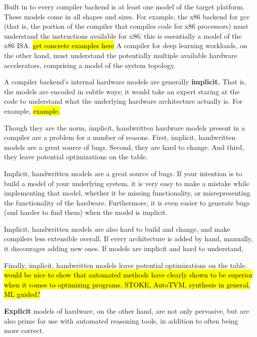 Built in to every compiler backend
  is at least one model
  of the target platform.
These models come in all shapes
  and sizes.
For example,
  the x86 backend for gcc
  (that is, the portion of the compiler
    that compiles code for x86 processors)
  must understand
  the instructions available
  for x86;
  this is essentially a model
  of the x86 ISA.
\hl{get concrete examples here}
A compiler for deep learning
  workloads,
  on the other hand,
  must understand
  the potentially multiple
  available hardware accelerators,
  comprising a model
  of the system topology.

A compiler backend's
  internal hardware models
  are generally
  \textbf{implicit.}
That is, 
  the models are encoded in subtle ways;
  it would take an expert
  staring at the code
  to understand what the underlying hardware
  architecture
  actually is.
For example, \hl{example.}
  
Though they are the norm,
  implicit, handwritten hardware models
  present in a compiler
  are a problem
  for a number of reasons.
First, implicit, handwritten models
  are a great source of bugs.
Second, they are hard to change.
And third, 
  they leave potential optimizations
  on the table.

Implicit,
  handwritten models
  are a great source of bugs.
If your intention is to build a model
  of your underlying system,
  it is very easy to make a mistake
  while implementing that model,
  whether it be missing functionality,
  or misrepresenting the functionality
  of the hardware.
Furthermore, it is even easier
  to generate bugs
  (and harder to find them)
  when the model is implicit.

Implicit, handwritten models
  are also
  hard to build and change,
  and make compilers less extensible overall.
If every architecture is added
  by hand, manually,
  it discourages adding new ones.
If models are implicit
  and hard to understand,


Finally,
  implicit, handwritten models
  leave potential optimizations on the table.
\hl{would be nice to show that automated methods have clearly shown
  to be superior when it comes to optimizing programs.
  STOKE, AutoTVM, synthesis in general, ML guided?}

\textbf{Explicit} models of hardware,
  on the other hand,
  are not only pervasive,
  but are also prime for use with automated reasoning tools,
  in addition to often being more correct.
  
